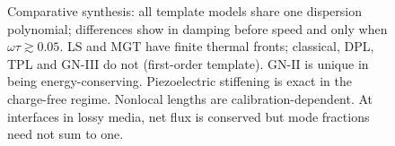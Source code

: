 \begin{figure}[t]
\begin{summarybox}[Summary]
Comparative synthesis: all template models share one dispersion polynomial; differences show in damping before speed and only when $\omega\tau\gtrsim0.05$. LS and MGT have finite thermal fronts; classical, DPL, TPL and GN-III do not (first-order template). GN-II is unique in being energy-conserving. Piezoelectric stiffening is exact in the charge-free regime. Nonlocal lengths are calibration-dependent. At interfaces in lossy media, net flux is conserved but mode fractions need not sum to one.
\end{summarybox}
\end{figure}
